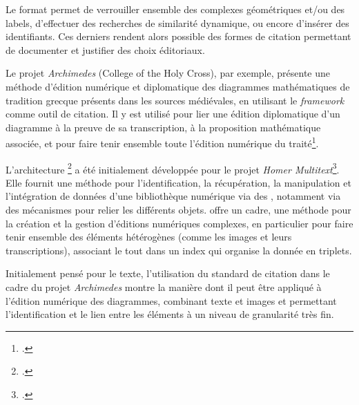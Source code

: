 Le format \svg permet de verrouiller ensemble des complexes géométriques
et/ou des labels, d'effectuer des recherches de similarité dynamique, ou
encore d'insérer des identifiants. Ces derniers rendent alors possible
des formes de citation permettant de documenter et justifier des choix
éditoriaux.

Le projet \emph{Archimedes} (College of the Holy Cross), par exemple,
présente une méthode d'édition numérique et diplomatique des diagrammes
mathématiques de tradition grecque présents dans les sources médiévales,
en utilisant le \emph{framework} \CITE comme outil de citation. Il y est
utilisé pour lier une édition diplomatique d'un diagramme à la preuve
de sa transcription, à la proposition mathématique associée, et pour
faire tenir ensemble toute l'édition numérique du traité\footcite{roughan_digital_2014}.

L'architecture \CITE\footcite{blackwell_cite_2019} a été
initialement développée pour le projet \textit{Homer Multitext}\footcite{noauthor_homer_nodate}. Elle fournit
une méthode pour l'identification, la récupération, la manipulation et
l'intégration de données d'une bibliothèque numérique via des \urns,
notamment via des mécanismes pour relier les différents objets. \CITE
offre un cadre, une méthode pour la création et la gestion d'éditions
numériques complexes, en particulier pour faire tenir ensemble des
éléments hétérogènes (comme les images et leurs transcriptions),
associant le tout dans un index qui organise la donnée en triplets.

Initialement pensé pour le texte, l'utilisation du standard de citation
\CITE dans le cadre du projet \emph{Archimedes} montre la manière dont il
peut être appliqué à l'édition numérique des diagrammes, combinant texte
et images et permettant l'identification et le lien entre les éléments à
un niveau de granularité très fin.

